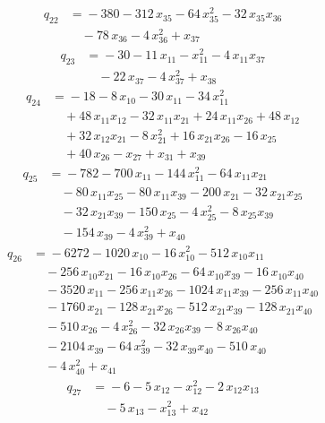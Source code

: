 \documentclass[11pt]{article}
\theoremstyle{remark}\newtheorem{remark}[theorem]{Remark}
\begin{document}
\begin{align*}
q_{22} &={}-380 -312\,x_{35} -64\,x_{35}^{2} -32\,x_{35}x_{36}\\
&\quad -78\,x_{36} -4\,x_{36}^{2} +x_{37}
\end{align*}
\begin{align*}
q_{23} &={}-30 -11\,x_{11} -x_{11}^{2} -4\,x_{11}x_{37}\\
&\quad -22\,x_{37} -4\,x_{37}^{2} +x_{38}
\end{align*}
\begin{align*}
q_{24} &={}-18 -8\,x_{10} -30\,x_{11} -34\,x_{11}^{2}\\
&\quad +48\,x_{11}x_{12} -32\,x_{11}x_{21} +24\,x_{11}x_{26} +48\,x_{12}\\
&\quad +32\,x_{12}x_{21} -8\,x_{21}^{2} +16\,x_{21}x_{26} -16\,x_{25}\\
&\quad +40\,x_{26} -x_{27} +x_{31} +x_{39}
\end{align*}
\begin{align*}
q_{25} &={}-782 -700\,x_{11} -144\,x_{11}^{2} -64\,x_{11}x_{21}\\
&\quad -80\,x_{11}x_{25} -80\,x_{11}x_{39} -200\,x_{21} -32\,x_{21}x_{25}\\
&\quad -32\,x_{21}x_{39} -150\,x_{25} -4\,x_{25}^{2} -8\,x_{25}x_{39}\\
&\quad -154\,x_{39} -4\,x_{39}^{2} +x_{40}
\end{align*}
\begin{align*}
q_{26} &={}-6272 -1020\,x_{10} -16\,x_{10}^{2} -512\,x_{10}x_{11}\\
&\quad -256\,x_{10}x_{21} -16\,x_{10}x_{26} -64\,x_{10}x_{39} -16\,x_{10}x_{40}\\
&\quad -3520\,x_{11} -256\,x_{11}x_{26} -1024\,x_{11}x_{39} -256\,x_{11}x_{40}\\
&\quad -1760\,x_{21} -128\,x_{21}x_{26} -512\,x_{21}x_{39} -128\,x_{21}x_{40}\\
&\quad -510\,x_{26} -4\,x_{26}^{2} -32\,x_{26}x_{39} -8\,x_{26}x_{40}\\
&\quad -2104\,x_{39} -64\,x_{39}^{2} -32\,x_{39}x_{40} -510\,x_{40}\\
&\quad -4\,x_{40}^{2} +x_{41}
\end{align*}
\begin{align*}
q_{27} &={}-6 -5\,x_{12} -x_{12}^{2} -2\,x_{12}x_{13}\\
&\quad -5\,x_{13} -x_{13}^{2} +x_{42}
\end{align*}
\end{document}
